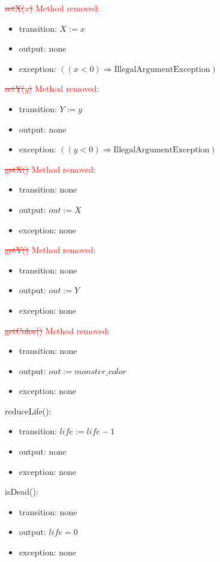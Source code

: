 \documentclass[12pt]{article}
\begin{document}
\noindent \textcolor{red}{\st{setX($\mathit{x}$)} Method removed}:
\begin{itemize}
\item transition: $X := x$ 
\item output: none
\item exception: $((\mathit{x} < 0) \Rightarrow \text{IllegalArgumentException})$
\end{itemize}

\noindent \textcolor{red}{\st{setY($\mathit{y}$)} Method removed}:
\begin{itemize}
\item transition: $Y := y$ 
\item output: none
\item exception: $((\mathit{y} < 0) \Rightarrow \text{IllegalArgumentException})$
\end{itemize}

\noindent \textcolor{red}{\st{getX()} Method removed}:
\begin{itemize}
\item transition: none
\item output: $out := X$
\item exception: none
\end{itemize}

\noindent \textcolor{red}{\st{getY()} Method removed}:
\begin{itemize}
\item transition: none
\item output: $out := Y$
\item exception: none
\end{itemize}

\noindent \textcolor{red}{\st{getColor()} Method removed}:
\begin{itemize}
\item transition: none
\item output: $out := monster\_color$
\item exception: none
\end{itemize}

\noindent reduceLife():
\begin{itemize}
\item transition: $life := life - 1$
\item output: none
\item exception: none
\end{itemize}

\noindent isDead():
\begin{itemize}
\item transition: none
\item output: $life = 0$
\item exception: none
\end{itemize}
\end{document}
